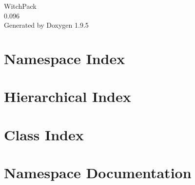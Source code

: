 \documentclass[twoside]{book}
\newcommand{\+}{\discretionary{\mbox{\scriptsize$\hookleftarrow$}}{}{}}
\newcommand{\clearemptydoublepage}{%
    \newpage{\pagestyle{empty}\cleardoublepage}%
  }
\begin{document}
  \raggedbottom
    \hypersetup{pageanchor=false,
                bookmarksnumbered=true,
                pdfencoding=unicode
               }
  \begin{titlepage}
  \vspace*{7cm}
  \begin{center}%
  {\Large Witch\+Pack}\\
  [1ex]\large 0.\+096 \\
  \vspace*{1cm}
  {\large Generated by Doxygen 1.9.5}\\
  \end{center}
  \end{titlepage}
  \clearemptydoublepage
  \tableofcontents
  \clearemptydoublepage
  \hypersetup{pageanchor=true}
\chapter{Namespace Index}

\chapter{Hierarchical Index}

\chapter{Class Index}

\chapter{Namespace Documentation}





\end{document}
